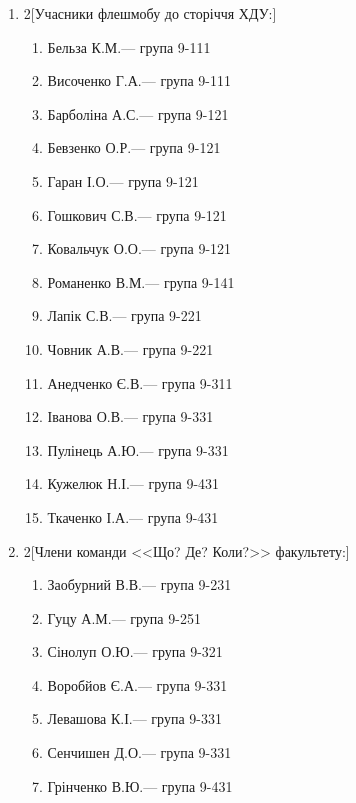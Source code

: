\documentclass[
	a4paper,
	12pt,
	oneside,
	draft
]{extreport}
\begin{document}
{\begin{enumerate}[label=\Roman*.]
\item \begin{multicols}{2}[Учасники флешмобу до сторіччя ХДУ:]
\begin{enumerate}[topsep=0pt,itemsep=-1ex,partopsep=1ex,parsep=1ex,label=\arabic*.]
\item Бельза К.М.\hfill --- група 9-111
\item Височенко Г.А.\hfill --- група 9-111
\item Барболіна А.С.\hfill --- група 9-121
\item Бевзенко О.Р.\hfill --- група 9-121
\item Гаран І.О.\hfill --- група 9-121
\item Гошкович С.В.\hfill --- група 9-121
\item Ковальчук О.О.\hfill --- група 9-121
\item Романенко В.М.\hfill --- група 9-141
\item Лапік С.В.\hfill --- група 9-221
\item Човник А.В.\hfill --- група 9-221
\item Анедченко Є.В.\hfill --- група 9-311
\item Іванова О.В.\hfill --- група 9-331
\item Пулінець А.Ю.\hfill --- група 9-331
\item Кужелюк Н.І.\hfill --- група 9-431
\item Ткаченко І.А.\hfill --- група 9-431
\end{enumerate}
\end{multicols}


\item \begin{multicols}{2}[Члени команди <<Що? Де? Коли?>> факультету:]
\begin{enumerate}[topsep=0pt,itemsep=-1ex,partopsep=1ex,parsep=1ex,label=\arabic*.]
\item Заобурний В.В.\hfill --- група 9-231
\item Гуцу А.М.\hfill --- група 9-251
\item Сінолуп О.Ю.\hfill --- група 9-321
\item Воробйов Є.А.\hfill --- група 9-331
\item Левашова К.І.\hfill --- група 9-331
\item Сенчишен Д.О.\hfill --- група 9-331
\item Грінченко В.Ю.\hfill --- група 9-431
\end{enumerate}
\end{multicols}



\end{enumerate}}
\end{document}
